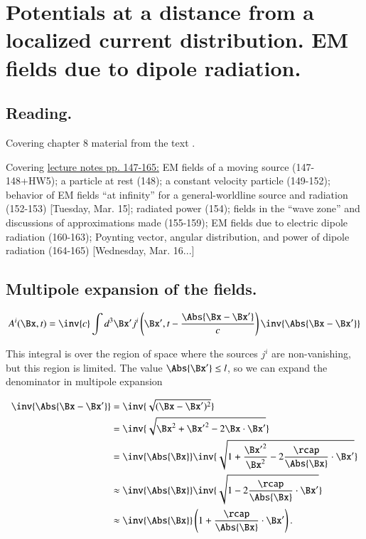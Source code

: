 %
%

\chapter{Potentials at a distance from a localized current distribution.  EM fields due to dipole radiation.}
\label{chap:relativisticElectrodynamicsL20}
{}
\date{Mar 15, 2011}

\beginArtNoToc

\section{Reading.}

Covering chapter 8 material from the text \cite{landau1980classical}.

Covering \href{http://www.physics.utoronto.ca/~poppitz/epoppitz/PHY450_files/RelEMpp147-165.pdf}{lecture notes pp. 147-165:} EM fields of a moving source (147-148+HW5); a particle at rest (148); a constant velocity particle (149-152); behavior of EM fields ``at infinity'' for a general-worldline source and radiation (152-153) [Tuesday, Mar. 15]; radiated power (154); fields in the ``wave zone'' and discussions of approximations made (155-159); EM fields due to electric dipole radiation (160-163); Poynting vector, angular distribution, and power of dipole radiation (164-165) [Wednesday, Mar. 16...]

\section{Multipole expansion of the fields.}

\begin{equation}\label{eqn:relativisticElectrodynamicsL20:10}
A^i(\Bx, t) = \inv{c} \int d^3 \Bx' j^i\left(\Bx', t - \frac{\Abs{\Bx - \Bx'} }{c}\right) \inv{\Abs{\Bx - \Bx'} }
\end{equation}

This integral is over the region of space where the sources $j^i$ are non-vanishing, but this region is limited.  The value $\Abs{\Bx'} \le l$, so we can expand the denominator in multipole expansion

\begin{align*}
\inv{\Abs{\Bx - \Bx'} }
&=
\inv{\sqrt{(\Bx - \Bx')^2} } \\
&=
\inv{\sqrt{\Bx^2 + {\Bx'}^2 - 2 \Bx \cdot \Bx'} } \\
&=
\inv{\Abs{\Bx} } \inv{\sqrt{1 + \frac{{\Bx'}^2}{\Bx^2} - 2 \frac{\rcap}{\Abs{\Bx} } \cdot \Bx'} } \\
&\approx
\inv{\Abs{\Bx} } \inv{\sqrt{1 - 2 \frac{\rcap}{\Abs{\Bx} } \cdot \Bx'} } \\
&\approx
\inv{\Abs{\Bx} } \left(1 + \frac{\rcap}{\Abs{\Bx} } \cdot \Bx' \right).
\end{align*}

